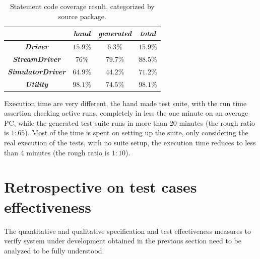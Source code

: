 \documentclass{article} \usepackage{times}
\begin{document}
\begin{table}[htbp]
  \caption{Statement code coverage result, categorized by source package.}
  \label{tab:statement_code_coverage}
  \begin{center}
    \begin{tabular}{|c|c|c|c|}\hline
      & \textbf{\textit{hand}} & \textbf{\textit{generated}} &
      \textbf{\textit{total}} \\\hline
      \textbf{\textit{Driver}} & $15.9 \%$ & $6.3 \%$ & $15.9 \%$ \\\hline
      \textbf{\textit{StreamDriver}} & $76 \%$ & $79.7 \%$ & $88.5 \%$ \\\hline
      \textbf{\textit{SimulatorDriver}} & $64.9 \%$ & $44.2 \%$ &
      $71.2 \%$ \\\hline
      \textbf{\textit{Utility}} & $98.1 \%$ & $74.5 \%$ & $98.1 \%$ \\\hline
    \end{tabular}
  \end{center}
\end{table}

Execution time are very different, the hand made test suite, with the
run time assertion checking active runs, completely in less the one
minute on an average PC, while the generated test suite runs in more
than 20 minutes (the rough ratio is $ 1 : 65 $). Most of the time is
spent on setting up the suite, only considering the real execution of
the tests, with no suite setup, the execution time reduces to less
than 4 minutes (the rough ratio is $ 1 : 10 $).



\section{Retrospective on test cases effectiveness}
\label{sec:test_cases_retrospectives}

The quantitative and qualitative specification and test effectiveness
measures to verify system under development obtained in the previous
section need to be analyzed to be fully understood.
\end{document}
